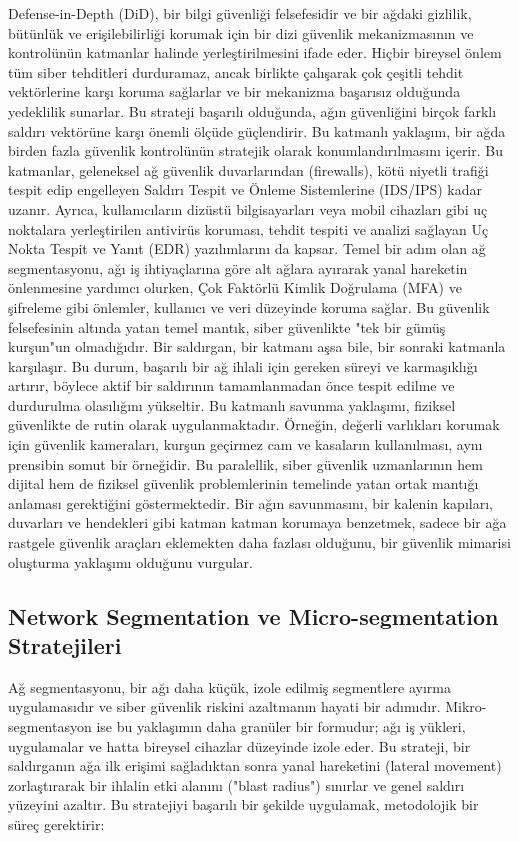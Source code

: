 Defense-in-Depth (DiD), bir bilgi güvenliği felsefesidir ve bir ağdaki gizlilik, bütünlük ve erişilebilirliği korumak için bir dizi güvenlik mekanizmasının ve kontrolünün katmanlar halinde yerleştirilmesini ifade eder. Hiçbir bireysel önlem tüm siber tehditleri durduramaz, ancak birlikte çalışarak çok çeşitli tehdit vektörlerine karşı koruma sağlarlar ve bir mekanizma başarısız olduğunda yedeklilik sunarlar. Bu strateji başarılı olduğunda, ağın güvenliğini birçok farklı saldırı vektörüne karşı önemli ölçüde güçlendirir.
Bu katmanlı yaklaşım, bir ağda birden fazla güvenlik kontrolünün stratejik olarak konumlandırılmasını içerir. Bu katmanlar, geleneksel ağ güvenlik duvarlarından (firewalls), kötü niyetli trafiği tespit edip engelleyen Saldırı Tespit ve Önleme Sistemlerine (IDS/IPS) kadar uzanır. Ayrıca, kullanıcıların dizüstü bilgisayarları veya mobil cihazları gibi uç noktalara yerleştirilen antivirüs koruması, tehdit tespiti ve analizi sağlayan Uç Nokta Tespit ve Yanıt (EDR) yazılımlarını da kapsar. Temel bir adım olan ağ segmentasyonu, ağı iş ihtiyaçlarına göre alt ağlara ayırarak yanal hareketin önlenmesine yardımcı olurken, Çok Faktörlü Kimlik Doğrulama (MFA) ve şifreleme gibi önlemler, kullanıcı ve veri düzeyinde koruma sağlar.
Bu güvenlik felsefesinin altında yatan temel mantık, siber güvenlikte "tek bir gümüş kurşun"un olmadığıdır. Bir saldırgan, bir katmanı aşsa bile, bir sonraki katmanla karşılaşır. Bu durum, başarılı bir ağ ihlali için gereken süreyi ve karmaşıklığı artırır, böylece aktif bir saldırının tamamlanmadan önce tespit edilme ve durdurulma olasılığını yükseltir. Bu katmanlı savunma yaklaşımı, fiziksel güvenlikte de rutin olarak uygulanmaktadır. Örneğin, değerli varlıkları korumak için güvenlik kameraları, kurşun geçirmez cam ve kasaların kullanılması, aynı prensibin somut bir örneğidir. Bu paralellik, siber güvenlik uzmanlarının hem dijital hem de fiziksel güvenlik problemlerinin temelinde yatan ortak mantığı anlaması gerektiğini göstermektedir. Bir ağın savunmasını, bir kalenin kapıları, duvarları ve hendekleri gibi katman katman korumaya benzetmek, sadece bir ağa rastgele güvenlik araçları eklemekten daha fazlası olduğunu, bir güvenlik mimarisi oluşturma yaklaşımı olduğunu vurgular.

\subsection{Network Segmentation ve Micro-segmentation Stratejileri}

Ağ segmentasyonu, bir ağı daha küçük, izole edilmiş segmentlere ayırma uygulamasıdır ve siber güvenlik riskini azaltmanın hayati bir adımıdır. Mikro-segmentasyon ise bu yaklaşımın daha granüler bir formudur; ağı iş yükleri, uygulamalar ve hatta bireysel cihazlar düzeyinde izole eder. Bu strateji, bir saldırganın ağa ilk erişimi sağladıktan sonra yanal hareketini (lateral movement) zorlaştırarak bir ihlalin etki alanını ("blast radius") sınırlar ve genel saldırı yüzeyini azaltır.
Bu stratejiyi başarılı bir şekilde uygulamak, metodolojik bir süreç gerektirir:

